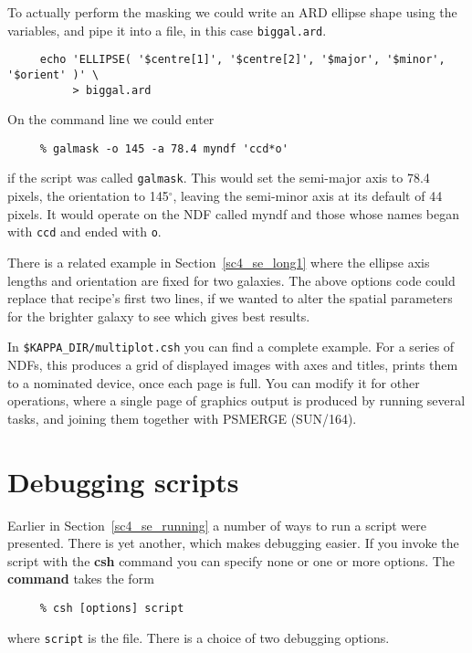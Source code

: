 \documentclass[twoside,11pt]{article}
\newcommand{\htmlref}[2]{#1}
\newcommand{\latex}[1]{#1}
\newcommand{\xref}[3]{#1}
\newcommand{\xlabel}[1]{}
\newcommand{\dgs}{\hbox{$^\circ$}}
\newcommand{\PSMERGEref}{\xref{{\footnotesize PSMERGE}}{sun164}{}}
\begin{document}
To actually perform the masking we could write an \htmlref{{\sf
ARD}}{sc4_gl_ard} ellipse shape using the variables, and 
\htmlref{{\sf pipe}}{sc4_gl_pipe} it into a
file, in this case {\tt biggal.ard}.

\small
\begin{verbatim}
     echo 'ELLIPSE( '$centre[1]', '$centre[2]', '$major', '$minor', '$orient' )' \
          > biggal.ard
\end{verbatim}
\normalsize

On the command line we could enter

\small
\begin{verbatim}
     % galmask -o 145 -a 78.4 myndf 'ccd*o'
\end{verbatim}
\normalsize
if the script was called {\tt galmask}.  This would set the semi-major
axis to 78.4 pixels, the orientation to 145\dgs, leaving the
semi-minor axis at its default of 44 pixels.  It would operate on
the NDF called myndf and those whose names began with {\tt ccd} and
ended with {\tt o}.

There is a \htmlref{related example}{sc4_se_long1} \latex{in
Section~\ref{sc4_se_long1}} where the ellipse axis lengths and
orientation are fixed for two galaxies.  The above options code could
replace that recipe's first two lines, if we wanted to alter the
spatial parameters for the brighter galaxy to see which gives best
results.

In {\tt \$KAPPA\_DIR/multiplot.csh} you can find a complete example.
For a series of NDFs, this produces a grid of displayed images with
axes and titles, prints them to a nominated device, once each page is
full.  You can modify it for other operations, where a single page of
graphics output is produced by running several tasks, and joining them
together with \PSMERGEref\latex{ (SUN/164)}.

\newpage
\section{\xlabel{sc4_se_debugging}Debugging scripts
\label{sc4_se_debugging}}

\htmlref{Earlier}{sc4_se_running} \latex{in
Section~\ref{sc4_se_running}} a number of ways to run a
script were presented.  There is yet another, which makes debugging
easier.  If you invoke the script with the {\bf csh} command you can
specify none or one or more options.  The {\bf command} takes the form

\small
\begin{verbatim}
     % csh [options] script
\end{verbatim}
\normalsize
where {\tt script} is the file.  There is a choice of two debugging
options.
\end{document}
